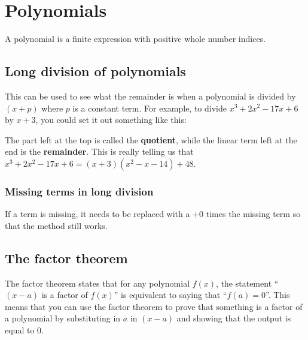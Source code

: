 \section{Polynomials}
A polynomial is a finite expression with positive whole number indices.
\subsection{Long division of polynomials}
This can be used to see what the remainder is when a polynomial is divided by $(x+p)$ where $p$ is a constant term. For example, to divide $x^3+2x^2-17x+6$ by $x+3$, you could set it out something like this:


The part left at the top is called the \textbf{quotient}, while the linear term left at the end is the \textbf{remainder}. This is really telling us that $x^3+2x^2-17x+6=(x+3)(x^2-x-14)+48$.

\subsubsection{Missing terms in long division}
If a term is missing, it needs to be replaced with a $+0$ times the missing term so that the method still works.

\subsection{The factor theorem}
The factor theorem states that for any polynomial $f(x)$, the statement ``$(x-a)$ is a factor of $f(x)$'' is equivalent to saying that ``$f(a)=0$''. This means that you can use the factor theorem to prove that something is a factor of a polynomial by substituting in $a$ in $(x-a)$ and showing that the output is equal to $0$.


